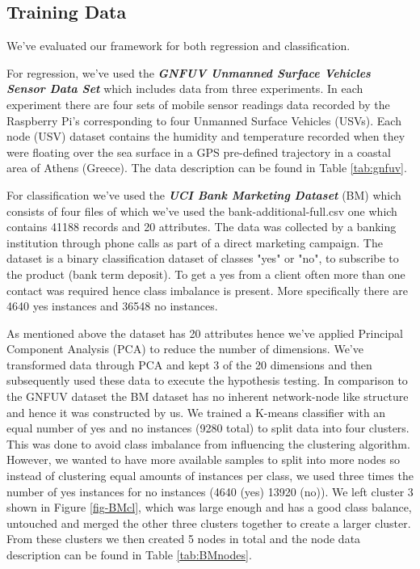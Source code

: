 \documentclass{mpaper}
\begin{document}
\subsection{Training Data}\label{chap:training_data}

We've evaluated our framework for both regression and classification. 

For regression, we've used the \textbf{\textit{GNFUV Unmanned Surface Vehicles Sensor Data Set}} \cite{GNFUV} which includes data from three experiments. In each experiment there are four sets of mobile sensor readings data recorded by the Raspberry Pi's corresponding to four Unmanned Surface Vehicles (USVs). Each node (USV) dataset contains the humidity and temperature recorded when they were floating over the sea surface in a GPS pre-defined trajectory in a coastal area of Athens (Greece). The data description can be found in Table \ref{tab:gnfuv}. 

For classification we've used the \textbf{\textit{UCI Bank Marketing Dataset}} (BM) \cite{BMDataset} which consists of four files of which we've used the bank-additional-full.csv one which contains 41188 records and 20 attributes. The data was collected by a banking institution through phone calls as part of a direct marketing campaign. The dataset is a binary classification dataset of classes "yes" or "no", to subscribe to the product (bank term deposit). To get a yes from a client often more than one contact was required hence class imbalance is present. More specifically there are 4640 yes instances and 36548 no instances. 

As mentioned above the dataset has 20 attributes hence we've applied Principal Component Analysis (PCA) to reduce the number of dimensions. We've transformed data through PCA and kept 3 of the 20 dimensions and then subsequently used these data to execute the hypothesis testing. In comparison to the GNFUV dataset the BM dataset has no inherent network-node like structure and hence it was constructed by us. We trained a K-means classifier with an equal number of yes and no instances (9280 total) to split data into four clusters. This was done to avoid class imbalance from influencing the clustering algorithm. However, we wanted to have more available samples to split into more nodes so instead of clustering equal amounts of instances per class, we used three times the number of yes instances for no instances (4640 (yes) 13920 (no)). We left cluster 3 shown in Figure \ref{fig-BMcl}, which was large enough and has a good class balance, untouched and merged the other three clusters together to create a larger cluster. From these clusters we then created 5 nodes in total and the node data description can be found in Table \ref{tab:BMnodes}. 
\end{document}
